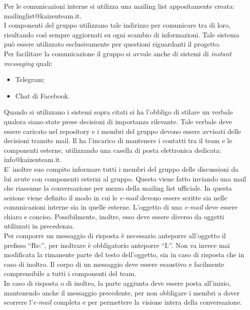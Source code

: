 				Per  le comunicazioni interne si utilizza una mailing list appositamente creata: mailinglist@kaizenteam.it.\\
				I componenti del gruppo utilizzano tale indirizzo per comunicare tra di loro, risultando così sempre aggiornati su ogni scambio di informazioni. Tale sistema può essere utilizzato esclusivamente per questioni riguardanti il progetto.\\
				Per facilitare la comunicazione il gruppo si avvale anche di sistemi di \textit{instant messaging} quali:
				\begin{itemize}
					\item Telegram;
					\item Chat di Facebook.
				\end{itemize}
				Quando si utilizzano i sistemi sopra citati si ha l'obbligo di stilare un verbale qualora siano state prese decisioni di importanza rilevante. Tale verbale deve essere caricato nel repository e i membri del gruppo devono essere avvisati delle decisioni tramite mail.
				Il  ha l’incarico di mantenere i contatti tra il team e le componenti esterne, utilizzando una casella di posta elettronica dedicata: info@kaizenteam.it.\\
				E' inoltre suo compito informare tutti i membri del gruppo delle discussioni da lui avute con componenti esterni al gruppo. Questo viene fatto inviando una mail che riassume la conversazione per mezzo della mailing list ufficiale.
				In questa sezione viene definito il modo in cui le \textit{e-mail} devono essere scritte sia nelle comunicazioni interne sia in quelle esterne.
					L’oggetto di una \textit{e-mail} deve essere chiaro e conciso. Possibilmente, inoltre, esso deve essere diverso da oggetti utilizzati in precedenza.\\
					Per comporre un messaggio di risposta è necessario anteporre all’oggetto il prefisso “Re:”, per inoltrare è obbligatorio anteporre “I:”. Non va invece mai modificata la rimanente parte del testo dell'oggetto, sia in caso di risposta che in caso di inoltro.
					Il corpo di un messaggio deve essere esaustivo e facilmente comprensibile a tutti i componenti del team.\\
					In caso di risposta o di inoltro, la parte aggiunta deve essere posta all’inizio, mantenendo anche il messaggio precedente, per non obbligare i membri a dover scorrere l’\textit{e-mail} completa e per permettere la visione intera della conversazione.
